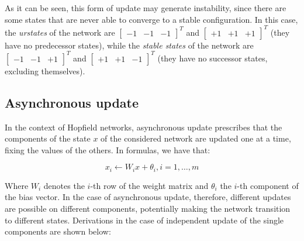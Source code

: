 \documentclass[letterpaper,headings=standardclasses]{scrartcl}
\begin{document}
As it can be seen, this form of update may generate instability, since there are some states that are never able to converge to a stable configuration. In this case, the \emph{urstates} of the network are $[\begin{matrix} -1 & -1 & -1 \end{matrix}]^T$ and $[\begin{matrix} +1 & +1 & +1 \end{matrix}]^T$ (they have no predecessor states), while the \emph{stable states} of the network are $[\begin{matrix} -1 & -1 & +1 \end{matrix}]^T$ and $[\begin{matrix} +1 & +1 & -1 \end{matrix}]^T$ (they have no successor states, excluding themselves).

\subsection{Asynchronous update}

In the context of Hopfield networks, asynchronous update prescribes that the components of the state $x$ of the considered network are updated one at a time, fixing the values of the others. In formulas, we have that:

$$ x_i \leftarrow W_i x + \theta_i, i = 1, \dots, m $$

Where $W_i$ denotes the $i$-th row of the weight matrix and $\theta_i$ the $i$-th component of the bias vector. In the case of asynchronous update, therefore, different updates are possible on different components, potentially making the network transition to different states. Derivations in the case of independent update of the single components are shown below:
\end{document}
